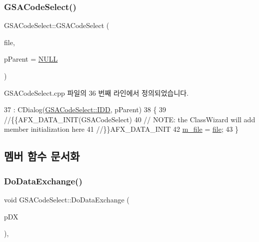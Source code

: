 \subsubsection{\texorpdfstring{G\+S\+A\+Code\+Select()}{GSACodeSelect()}}
{\footnotesize\ttfamily G\+S\+A\+Code\+Select\+::\+G\+S\+A\+Code\+Select (\begin{DoxyParamCaption}\item[{F\+I\+LE $\ast$}]{file,  }\item[{C\+Wnd $\ast$}]{p\+Parent = {\ttfamily \mbox{\hyperlink{_system_8h_a070d2ce7b6bb7e5c05602aa8c308d0c4}{N\+U\+LL}}} }\end{DoxyParamCaption})}



G\+S\+A\+Code\+Select.\+cpp 파일의 36 번째 라인에서 정의되었습니다.


\begin{DoxyCode}
37   : CDialog(\mbox{\hyperlink{class_g_s_a_code_select_a248fc16f816d8ee4cc8e8e16f71a0167acbcc533e23047c863f6466b3b84f499a}{GSACodeSelect::IDD}}, pParent)
38 \{
39   \textcolor{comment}{//\{\{AFX\_DATA\_INIT(GSACodeSelect)}
40   \textcolor{comment}{// NOTE: the ClassWizard will add member initialization here}
41   \textcolor{comment}{//\}\}AFX\_DATA\_INIT}
42   \mbox{\hyperlink{class_g_s_a_code_select_a96b171e4976a250bdcac447654cdef12}{m\_file}} = \mbox{\hyperlink{expr-lex_8cpp_a702945180aa732857b380a007a7e2a21}{file}};
43 \}
\end{DoxyCode}


\subsection{멤버 함수 문서화}
\mbox{\label{class_g_s_a_code_select_adae15096d0425900fee08d7bf710ac21}} 
\subsubsection{\texorpdfstring{Do\+Data\+Exchange()}{DoDataExchange()}}
{\footnotesize\ttfamily void G\+S\+A\+Code\+Select\+::\+Do\+Data\+Exchange (\begin{DoxyParamCaption}\item[{C\+Data\+Exchange $\ast$}]{p\+DX }\end{DoxyParamCaption})\hspace{0.3cm}{\ttfamily [protected]}, {\ttfamily [virtual]}}



